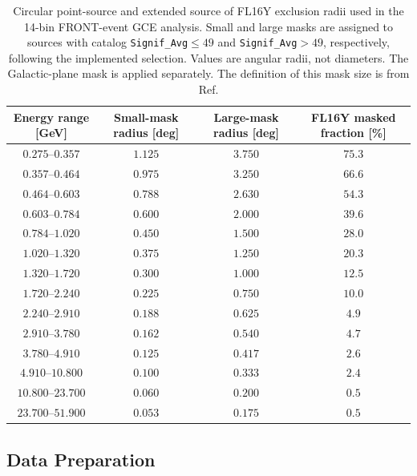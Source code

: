 \documentclass[superscriptaddress,
showpacs,preprintnumbers,nofootinbib,eqsecnum,amsmath,amssymb,aps,11pt, groupedaddress, floatfix]{revtex4-2}
\begin{document}
 \begin{table}[htbp]
    \centering
    \begin{tabular}{cccc}
      \hline
      Energy range [GeV] & Small-mask radius [deg] & Large-mask radius [deg] & FL16Y masked fraction [\%] \\
      \hline
      $0.275$--$0.357$   & $1.125$ & $3.750$ & $75.3$ \\
      $0.357$--$0.464$   & $0.975$ & $3.250$ & $66.6$ \\
      $0.464$--$0.603$   & $0.788$ & $2.630$ & $54.3$ \\
      $0.603$--$0.784$   & $0.600$ & $2.000$ & $39.6$ \\
      $0.784$--$1.020$   & $0.450$ & $1.500$ & $28.0$ \\
      $1.020$--$1.320$   & $0.375$ & $1.250$ & $20.3$ \\
      $1.320$--$1.720$   & $0.300$ & $1.000$ & $12.5$ \\
      $1.720$--$2.240$   & $0.225$ & $0.750$ & $10.0$ \\
      $2.240$--$2.910$   & $0.188$ & $0.625$ & $4.9$ \\
      $2.910$--$3.780$   & $0.162$ & $0.540$ & $4.7$ \\
      $3.780$--$4.910$   & $0.125$ & $0.417$ & $2.6$ \\
      $4.910$--$10.800$  & $0.100$ & $0.333$ & $2.4$ \\
      $10.800$--$23.700$ & $0.060$ & $0.200$ & $0.5$ \\
      $23.700$--$51.900$ & $0.053$ & $0.175$ & $0.5$ \\
      \hline
    \end{tabular}
    \caption{\justifying
    Circular point-source and extended source of FL16Y exclusion radii used in the
    14-bin FRONT-event GCE analysis. Small and large masks are
    assigned to sources with catalog \texttt{Signif\_Avg}$\leq49$
    and \texttt{Signif\_Avg}$>49$, respectively, following the
    implemented selection. Values are angular radii, not diameters.
    The Galactic-plane mask is applied separately. The definition of this mask size is from Ref. \cite{Cholis:2021rpp}}
    \label{tab:gce-point-source-mask-radii}
  \end{table}


\subsection{Data Preparation}
\end{document}
